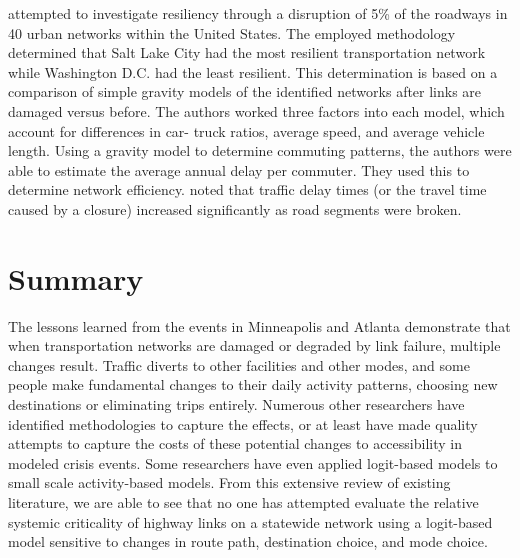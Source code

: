 \citet{ganin2017} attempted to investigate resiliency through a disruption
of 5\% of the roadways
in 40 urban networks within the United States. The employed methodology
determined that Salt Lake
City had the most resilient transportation network while Washington D.C.
had the least resilient.
This determination is based on a comparison of simple gravity models of the identified networks after links are
damaged versus before.
The authors worked three factors into each model, which account for
differences in car-
truck ratios, average speed, and average vehicle length. Using a gravity
model to determine commuting patterns, the authors were
able to estimate the average
annual delay per commuter. They used this to determine network efficiency.
\citet{ganin2017} noted that
traffic delay times (or the travel time caused by a closure) increased
significantly as road segments were broken.

\section{Summary}

The lessons learned from the events in Minneapolis and Atlanta demonstrate
that when
transportation networks are damaged or degraded by link failure, multiple
changes result. Traffic
diverts to other facilities and other modes, and some people make
fundamental changes to their
daily activity patterns, choosing new destinations or eliminating trips
entirely. Numerous other
researchers have identified methodologies to capture the effects, or at
least have made quality attempts to capture the costs of these
potential changes to accessibility in modeled crisis events. Some researchers
have even applied logit-based models to small scale activity-based models.
From this extensive review of existing literature, we are able to see that no
one has attempted evaluate the relative systemic
criticality of highway links on a statewide network using a logit-based model
sensitive to changes in route path, destination choice, and mode choice.
